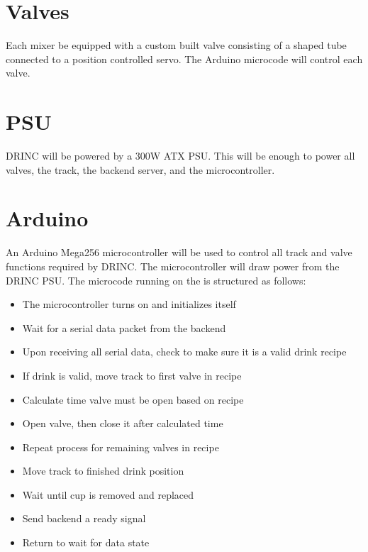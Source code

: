 {    \section{Valves}
        Each mixer be equipped with a custom built valve consisting of a 
        shaped tube connected to a position controlled servo.  The Arduino 
        microcode will control each valve.


    \section{PSU}
        DRINC will be powered by a 300W ATX PSU.  This will be enough to 
        power all valves, the track, the backend server, and the 
        microcontroller.

    \section{Arduino} 
        An Arduino Mega256 microcontroller will be used to control all track 
        and valve functions required by DRINC.  The microcontroller will 
        draw power from the DRINC PSU.  The microcode running on the is 
        structured as follows:
        \begin{itemize}
            \item The microcontroller turns on and initializes itself
            \item Wait for a serial data packet from the backend
            \item Upon receiving all serial data, check to make sure it is a valid drink recipe
            \item If drink is valid, move track to first valve in recipe
            \item Calculate time valve must be open based on recipe
            \item Open valve, then close it after calculated time
            \item Repeat process for remaining valves in recipe
            \item Move track to finished drink position
            \item Wait until cup is removed and replaced
            \item Send backend a ready signal
            \item Return to wait for data state
        \end{itemize}

}
